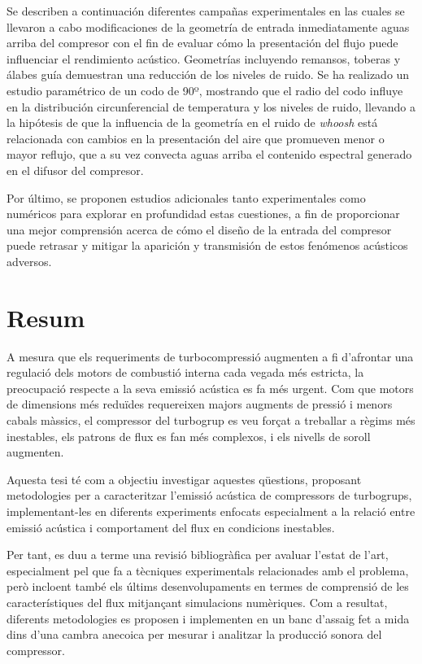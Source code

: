 Se describen a continuación diferentes campañas experimentales en las cuales se llevaron a cabo modificaciones de la geometría de entrada inmediatamente aguas arriba del compresor con el fin de evaluar cómo la presentación del flujo puede influenciar el rendimiento acústico. Geometrías incluyendo remansos, toberas y álabes guía demuestran una reducción de los niveles de ruido. Se ha realizado un estudio paramétrico de un codo de 90º, mostrando que el radio del codo influye en la distribución circunferencial de temperatura y los niveles de ruido, llevando a la hipótesis de que la influencia de la geometría en el ruido de \emph{whoosh} está relacionada con cambios en la presentación del aire que promueven menor o mayor reflujo, que a su vez convecta aguas arriba el contenido espectral generado en el difusor del compresor.

Por último, se proponen estudios adicionales tanto experimentales como numéricos para explorar en profundidad estas cuestiones, a fin de proporcionar una mejor comprensión acerca de cómo el diseño de la entrada del compresor puede retrasar y mitigar la aparición y transmisión de estos fenómenos acústicos adversos.

\cleardoublepage

\chapter*{Resum}

A mesura que els requeriments de turbocompressió augmenten a fi d'afrontar una regulació dels motors de combustió interna cada vegada més estricta, la preocupació respecte a la seva emissió acústica es fa més urgent. Com que motors de dimensions més reduïdes requereixen majors augments de pressió i menors cabals màssics, el compressor del turbogrup es veu forçat a treballar a règims més inestables, els patrons de flux es fan més complexos, i els nivells de soroll augmenten.

Aquesta tesi té com a objectiu investigar aquestes qüestions, proposant metodologies per a caracteritzar l'emissió acústica de compressors de turbogrups, implementant-les en diferents experiments enfocats especialment a la relació entre emissió acústica i comportament del flux en condicions inestables.

Per tant, es duu a terme una revisió bibliogràfica per avaluar l'estat de l'art, especialment pel que fa a tècniques experimentals relacionades amb el problema, però incloent també els últims desenvolupaments en termes de comprensió de les característiques del flux mitjançant simulacions numèriques. Com a resultat, diferents metodologies es proposen i implementen en un banc d'assaig fet a mida dins d'una cambra anecoica per mesurar i analitzar la producció sonora del compressor.

